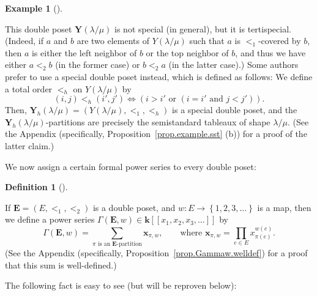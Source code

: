 \documentclass[numbers=enddot,12pt,final,onecolumn,notitlepage,abstracton]{scrartcl}
\theoremstyle{definition}
\newtheorem{defi}[theo]{Definition}
\newenvironment{definition}[1][]
{\begin{defi}[#1]\begin{leftbar}}
{\end{leftbar}\end{defi}}
\newtheorem{exam}[theo]{Example}
\newenvironment{example}[1][]
{\begin{exam}[#1]\begin{leftbar}}
{\end{leftbar}\end{exam}}
\let\sumnonlimits\sum
\let\prodnonlimits\prod
\renewcommand{\sum}{\sumnonlimits\limits}
\renewcommand{\prod}{\prodnonlimits\limits}
\newenvironment{verlong}{}{}
\newcommand{\xx}{{\mathbf{x}}}
\newcommand{\Powser}{\mathbf{k}\left[\left[x_1,x_2,x_3,\ldots\right]\right]}
\newcommand{\EE}{{\mathbf{E}}}
\begin{document}
\begin{example}
This double poset $\mathbf{Y}\left(\lambda / \mu\right)$
is not special (in general), but it is tertispecial. (Indeed,
if $a$ and $b$ are two elements of $Y\left(\lambda / \mu\right)$
such that $a$ is $<_1$-covered by $b$, then $a$ is either the left
neighbor of $b$ or the top neighbor of $b$, and thus we have
either $a <_2 b$ (in the former case) or $b <_2 a$ (in the latter
case).) Some authors prefer to use a special double poset instead,
which is defined as follows: We define a total
order $<_h$ on $Y\left(\lambda / \mu\right)$ by
\[
\left(i,j\right) <_h \left(i',j'\right) \Longleftrightarrow
\left( i > i' \text{ or } \left( i = i' \text{ and }
j < j' \right) \right) .
\]
Then, $\mathbf{Y}_h\left(\lambda / \mu\right)
= \left(Y\left(\lambda / \mu\right), <_1, <_h\right)$ is a special
double poset, and the
$\mathbf{Y}_h\left(\lambda / \mu\right)$-partitions
are precisely the semistandard tableaux of shape
$\lambda / \mu$.
\begin{verlong}
(See the Appendix
(specifically, Proposition~\ref{prop.example.sst} (b))
for a proof of the latter claim.)
\end{verlong}
\end{example}

We now assign a certain formal power series to every double poset:

\begin{definition}
\label{def.Gammaw}
If $\EE = \left(E, <_1, <_2\right)$ is a double poset, and
$w : E \to \left\{1, 2, 3, \ldots\right\}$ is a map, then we define
a power series $\Gamma\left(\EE , w\right) \in \Powser$ by
\[
\Gamma\left(\EE , w\right)
= \sum_{\pi\text{ is an }\EE\text{-partition}}
  \xx_{\pi, w} ,
\qquad
\text{where } \xx_{\pi, w}
= \prod_{e \in E} x_{\pi\left(e\right)}^{w\left(e\right)} .
\]
\begin{verlong}
(See the Appendix
(specifically, Proposition~\ref{prop.Gammaw.welldef})
for a proof that this sum is well-defined.)
\end{verlong}
\end{definition}

The following fact is easy to see (but will be reproven below):
\end{document}
